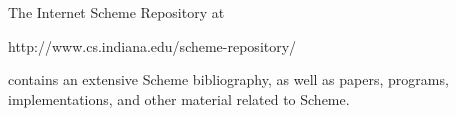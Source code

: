 
The Internet Scheme Repository at
\begin{center}
{\cf http://www.cs.indiana.edu/scheme-repository/}
\end{center}
contains an extensive Scheme bibliography, as well as papers,
programs, implementations, and other material related to Scheme.


